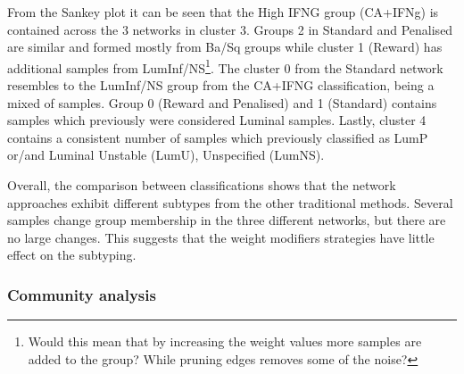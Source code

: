 From the Sankey plot it can be seen that the High IFNG group (CA+IFNg) is contained across the 3 networks in cluster 3. Groups 2 in Standard and Penalised are similar and formed mostly from Ba/Sq groups while cluster 1 (Reward) has additional samples from LumInf/NS\footnote{Would this mean that by increasing the weight values more samples are added to the group? While pruning edges removes some of the noise?}. The cluster 0 from the Standard network resembles to the LumInf/NS group from the CA+IFNG classification, being a mixed of samples. Group 0 (Reward and Penalised) and 1 (Standard) contains samples which previously were considered Luminal samples. Lastly, cluster 4 contains a consistent number of samples which previously classified as LumP or/and Luminal Unstable (LumU), Unspecified (LumNS).

Overall, the comparison between classifications shows that the network approaches exhibit different subtypes from the other traditional methods. Several samples change group membership in the three different networks, but there are no large changes. This suggests that the weight modifiers strategies have little effect on the subtyping.


\subsubsection{Community analysis}


